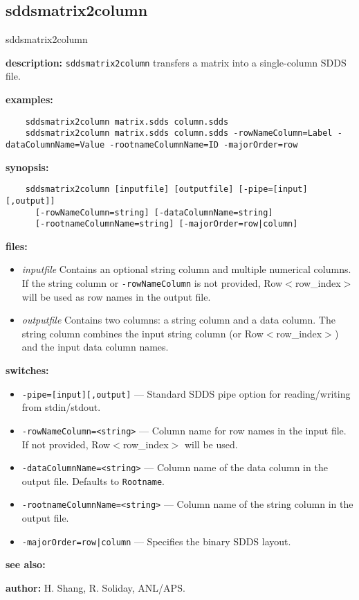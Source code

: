 \newpage
\subsection{sddsmatrix2column}
\label{sddsmatrix2column}

\begin{sddsprog}{sddsmatrix2column}
  \item \textbf{description:} \verb|sddsmatrix2column| transfers a matrix into a single-column SDDS file.
  \item \textbf{examples:}
    \begin{verbatim}
    sddsmatrix2column matrix.sdds column.sdds
    sddsmatrix2column matrix.sdds column.sdds -rowNameColumn=Label -dataColumnName=Value -rootnameColumnName=ID -majorOrder=row
    \end{verbatim}
  \item \textbf{synopsis:}
    \begin{verbatim}
    sddsmatrix2column [inputfile] [outputfile] [-pipe=[input][,output]]
      [-rowNameColumn=string] [-dataColumnName=string]
      [-rootnameColumnName=string] [-majorOrder=row|column]
    \end{verbatim}
  \item \textbf{files:}
    \begin{itemize}
      \item {\em inputfile} Contains an optional string column and multiple numerical columns. If the string column or \verb|-rowNameColumn| is not provided, Row$<$row\_index$>$ will be used as row names in the output file.
      \item {\em outputfile} Contains two columns: a string column and a data column. The string column combines the input string column (or Row$<$row\_index$>$) and the input data column names.
    \end{itemize}
  \item \textbf{switches:}
    \begin{itemize}
      \item \verb|-pipe=[input][,output]| --- Standard SDDS pipe option for reading/writing from stdin/stdout.
      \item \verb|-rowNameColumn=<string>| --- Column name for row names in the input file. If not provided, Row$<$row\_index$>$ will be used.
      \item \verb|-dataColumnName=<string>| --- Column name of the data column in the output file. Defaults to \verb|Rootname|.
      \item \verb|-rootnameColumnName=<string>| --- Column name of the string column in the output file.
      \item \verb+-majorOrder=row|column+ --- Specifies the binary SDDS layout.
    \end{itemize}
  \item \textbf{see also:} 
  \item \textbf{author:} H. Shang, R. Soliday, ANL/APS.
\end{sddsprog}


